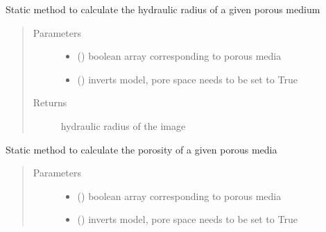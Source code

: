 \documentclass[letterpaper,10pt,english]{sphinxmanual}
\begin{document}
\begin{fulllineitems}
\begin{fulllineitems}
\label{\detokenize{index:lb_colloids.utilities.psphere.PSphere.static_hydraulic_radius}}
Static method to calculate the hydraulic radius of a given porous medium
\begin{quote}\begin{description}
\item[{Parameters}] \leavevmode\begin{itemize}
\item {} 
 () \textendash{} boolean array corresponding to porous media

\item {} 
 () \textendash{} inverts model, pore space needs to be set to True

\end{itemize}

\item[{Returns}] \leavevmode
hydraulic radius of the image

\end{description}\end{quote}

\end{fulllineitems}


\begin{fulllineitems}
\label{\detokenize{index:lb_colloids.utilities.psphere.PSphere.static_porosity}}
Static method to calculate the porosity of a given porous media
\begin{quote}\begin{description}
\item[{Parameters}] \leavevmode\begin{itemize}
\item {} 
 () \textendash{} boolean array corresponding to porous media

\item {} 
 () \textendash{} inverts model, pore space needs to be set to True


\end{itemize}
\end{description}
\end{quote}
\end{fulllineitems}
\end{fulllineitems}
\end{document}
